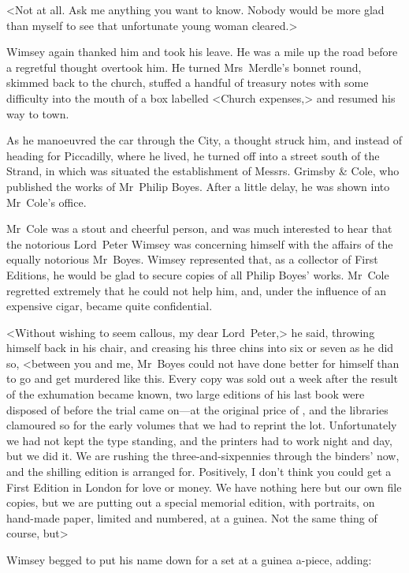 <Not at all. Ask me anything you want to know. Nobody would be more glad than myself to see that unfortunate young woman cleared.>

Wimsey again thanked him and took his leave. He was a mile up the road before a regretful thought overtook him. He turned Mrs~Merdle's bonnet round, skimmed back to the church, stuffed a handful of treasury notes with some difficulty into the mouth of a box labelled <Church expenses,> and resumed his way to town.

\divider

As he manoeuvred the car through the City, a thought struck him, and instead of heading for Piccadilly, where he lived, he turned off into a street south of the Strand, in which was situated the establishment of Messrs. Grimsby \& Cole, who published the works of Mr~Philip Boyes. After a little delay, he was shown into Mr~Cole's office.

Mr~Cole was a stout and cheerful person, and was much interested to hear that the notorious Lord~Peter Wimsey was concerning himself with the affairs of the equally notorious Mr~Boyes. Wimsey represented that, as a collector of First Editions, he would be glad to secure copies of all Philip Boyes' works. Mr~Cole regretted extremely that he could not help him, and, under the influence of an expensive cigar, became quite confidential.

<Without wishing to seem callous, my dear Lord~Peter,> he said, throwing himself back in his chair, and creasing his three chins into six or seven as he did so, <between you and me, Mr~Boyes could not have done better for himself than to go and get murdered like this. Every copy was sold out a week after the result of the exhumation became known, two large editions of his last book were disposed of before the trial came on—at the original price of , and the libraries clamoured so for the early volumes that we had to reprint the lot. Unfortunately we had not kept the type standing, and the printers had to work night and day, but we did it. We are rushing the three-and-sixpennies through the binders' now, and the shilling edition is arranged for. Positively, I don't think you could get a First Edition in London for love or money. We have nothing here but our own file copies, but we are putting out a special memorial edition, with portraits, on hand-made paper, limited and numbered, at a guinea. Not the same thing of course, but\longdash>

Wimsey begged to put his name down for a set at a guinea a-piece, adding:

